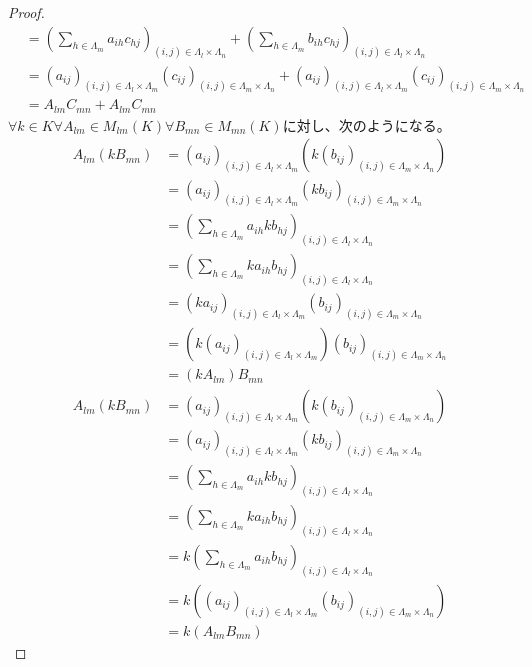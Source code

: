 \documentclass[dvipdfmx]{jsarticle}
\begin{document}
\begin{proof}
\begin{align*}
&= \left( \sum_{h \in \varLambda_{m}} {a_{ih}c_{hj}} \right)_{(i,j) \in \varLambda_{l} \times \varLambda_{n}} + \left( \sum_{h \in \varLambda_{m}} {b_{ih}c_{hj}} \right)_{(i,j) \in \varLambda_{l} \times \varLambda_{n}}\\
&= \left( a_{ij} \right)_{(i,j) \in \varLambda_{l} \times \varLambda_{m}}\left( c_{ij} \right)_{(i,j) \in \varLambda_{m} \times \varLambda_{n}} + \left( a_{ij} \right)_{(i,j) \in \varLambda_{l} \times \varLambda_{m}}\left( c_{ij} \right)_{(i,j) \in \varLambda_{m} \times \varLambda_{n}}\\
&= A_{lm}C_{mn} + A_{lm}C_{mn}
\end{align*}
$\forall k \in K\forall A_{lm} \in M_{lm}(K)\forall B_{mn} \in M_{mn}(K)$に対し、次のようになる。
\begin{align*}
A_{lm}\left( kB_{mn} \right) &= \left( a_{ij} \right)_{(i,j) \in \varLambda_{l} \times \varLambda_{m}}\left( k\left( b_{ij} \right)_{(i,j) \in \varLambda_{m} \times \varLambda_{n}} \right)\\
&= \left( a_{ij} \right)_{(i,j) \in \varLambda_{l} \times \varLambda_{m}}\left( kb_{ij} \right)_{(i,j) \in \varLambda_{m} \times \varLambda_{n}}\\
&= \left( \sum_{h \in \varLambda_{m}} {a_{ih}kb_{hj}} \right)_{(i,j) \in \varLambda_{l} \times \varLambda_{n}}\\
&= \left( \sum_{h \in \varLambda_{m}} {ka_{ih}b_{hj}} \right)_{(i,j) \in \varLambda_{l} \times \varLambda_{n}}\\
&= \left( ka_{ij} \right)_{(i,j) \in \varLambda_{l} \times \varLambda_{m}}\left( b_{ij} \right)_{(i,j) \in \varLambda_{m} \times \varLambda_{n}}\\
&= \left( k\left( a_{ij} \right)_{(i,j) \in \varLambda_{l} \times \varLambda_{m}} \right)\left( b_{ij} \right)_{(i,j) \in \varLambda_{m} \times \varLambda_{n}}\\
&= \left( kA_{lm} \right)B_{mn}\\
A_{lm}\left( kB_{mn} \right) &= \left( a_{ij} \right)_{(i,j) \in \varLambda_{l} \times \varLambda_{m}}\left( k\left( b_{ij} \right)_{(i,j) \in \varLambda_{m} \times \varLambda_{n}} \right)\\
&= \left( a_{ij} \right)_{(i,j) \in \varLambda_{l} \times \varLambda_{m}}\left( kb_{ij} \right)_{(i,j) \in \varLambda_{m} \times \varLambda_{n}}\\
&= \left( \sum_{h \in \varLambda_{m}} {a_{ih}kb_{hj}} \right)_{(i,j) \in \varLambda_{l} \times \varLambda_{n}}\\
&= \left( \sum_{h \in \varLambda_{m}} {ka_{ih}b_{hj}} \right)_{(i,j) \in \varLambda_{l} \times \varLambda_{n}}\\
&= k\left( \sum_{h \in \varLambda_{m}} {a_{ih}b_{hj}} \right)_{(i,j) \in \varLambda_{l} \times \varLambda_{n}}\\
&= k\left( \left( a_{ij} \right)_{(i,j) \in \varLambda_{l} \times \varLambda_{m}}\left( b_{ij} \right)_{(i,j) \in \varLambda_{m} \times \varLambda_{n}} \right)\\
&= k\left( A_{lm}B_{mn} \right)
\end{align*}
\end{proof}
\end{document}
